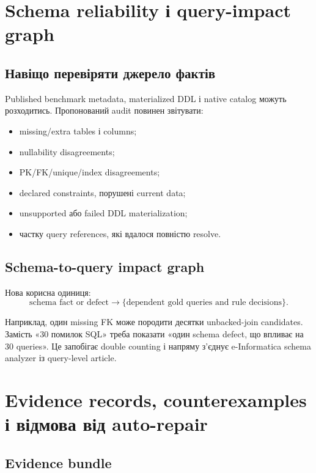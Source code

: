 \documentclass[11pt,a4paper]{article}
\begin{document}
\section{Schema reliability і query-impact graph}

\subsection{Навіщо перевіряти джерело фактів}

Published benchmark metadata, materialized DDL і native catalog можуть розходитись.
Пропонований audit повинен звітувати:

\begin{itemize}
\item missing/extra tables і columns;
\item nullability disagreements;
\item PK/FK/unique/index disagreements;
\item declared constraints, порушені current data;
\item unsupported або failed DDL materialization;
\item частку query references, які вдалося повністю resolve.
\end{itemize}

\subsection{Schema-to-query impact graph}

Нова корисна одиниця:
\[
\text{schema fact or defect} \longrightarrow
\{\text{dependent gold queries and rule decisions}\}.
\]

Наприклад, один missing FK може породити десятки unbacked-join candidates.
Замість «30 помилок SQL» треба показати «один schema defect, що впливає на 30
queries». Це запобігає double counting і напряму з'єднує e-Informatica schema
analyzer із query-level article.

\section{Evidence records, counterexamples і відмова від auto-repair}

\subsection{Evidence bundle}
\end{document}

